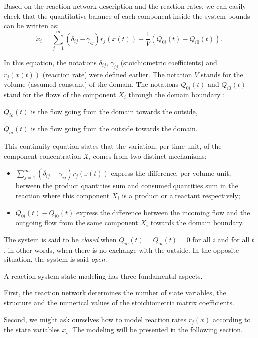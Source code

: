 Based on the reaction network description and the reaction rates, we can easily check
that the quantitative balance of each component inside the system bounds can be written as:
$$ \dot x_i = \sum_{j = 1}^{m} (\delta_{ij} - \gamma_{ij})r_j(x(t)) + \frac{1}{V}(Q_{0i}(t) - Q_{i0}(t)). \label{contireac} $$

In this equation, the notations $\delta_{ij}$, $\gamma_{ij}$ (stoichiometric coefficients) and $r_j(x(t))$ (reaction rate) were defined earlier.
The notation $V$ stands for the volume (assumed constant) of the domain.
The notations $Q_{0i}(t)$ and $Q_{i0}(t)$ stand for the flows of the component $X_i$ through the domain boundary :
\begin{description}
\item $Q_{io}(t)$ is the flow going from the domain towards the outside,
\item $Q_{oi}(t)$ is the flow going from the outside towards the domain.
\end{description}

This continuity equation states that the variation, per time unit, of the component concentration $X_i$ comes from two distinct mechanisms:
\begin{itemize}
\item $\sum_{j = 1}^{m} (\delta_{ij} - \gamma_{ij})r_j(x(t))$ express the difference, per volume unit, 
between the product quantities sum and consumed quantities sum in the reaction where this component $X_i$ is a product or a reactant respectively;
\item $Q_{0i}(t) - Q_{i0}(t)$ express the difference between the incoming flow and the outgoing flow from the same component $X_i$ towards the domain boundary.
\end{itemize}

The system is said to be {\em closed} when $Q_{io}(t) =  Q_{oi}(t) = 0$ for all $i$ and for all $t$,
in other words, when there is no exchange with the outside.
In the opposite situation, the system is said {\em open}. 

A reaction system state modeling has three fundamental aspects.

First, the reaction network determines the number of state variables, the structure and the numerical values of the stoichiometric matrix coefficients.

Second, we might ask ourselves how to model reaction rates $r_j(x)$ according to the state variables $x_i$.
The modeling will be presented in the following section.


